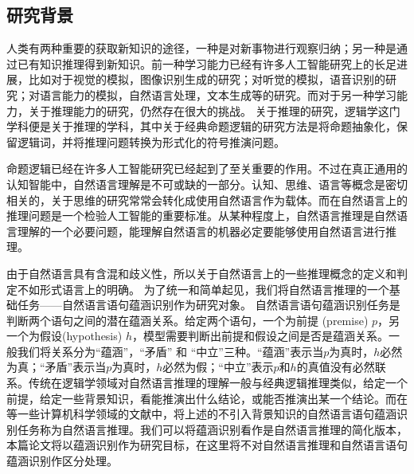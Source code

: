 \documentclass[UTF8,11pt,a4paper,nofonts]{ctexart}
\numberwithin{equation}{section}
\begin{document}
\subsection{研究背景}
\par


人类有两种重要的获取新知识的途径，一种是对新事物进行观察归纳；另一种是通过已有知识推理得到新知识。前一种学习能力已经有许多人工智能研究上的长足进展，比如对于视觉的模拟，图像识别生成的研究\cite{He2016DeepRL}；对听觉的模拟，语音识别的研究\cite{Chan2016ListenAA}；对语言能力的模拟，自然语言处理，文本生成等的研究\cite{Bahdanau2014NeuralMT, Vinyals2015ANC}。而对于另一种学习能力，关于推理能力的研究，仍然存在很大的挑战。
关于推理的研究，逻辑学这门学科便是关于推理的学科，其中关于经典命题逻辑的研究方法是将命题抽象化，保留逻辑词，并将推理问题转换为形式化的符号推演问题。

命题逻辑已经在许多人工智能研究已经起到了至关重要的作用。不过在真正通用的认知智能中，自然语言理解是不可或缺的一部分。认知、思维、语言等概念是密切相关的，关于思维的研究常常会转化成使用自然语言作为载体。而在自然语言上的推理问题是一个检验人工智能的重要标准。从某种程度上，自然语言推理是自然语言理解的一个必要问题，能理解自然语言的机器必定要能够使用自然语言进行推理。

由于自然语言具有含混和歧义性，所以关于自然语言上的一些推理概念的定义和判定不如形式语言上的明确\cite{Marneffe2008FindingCI, Marelli2014ASC}。
为了统一和简单起见，我们将自然语言推理的一个基础任务——自然语言语句蕴涵识别\cite{Nangia2017TheR2, Bowman2015ALA}作为研究对象。
自然语言语句蕴涵识别任务是判断两个语句之间的潜在蕴涵关系。给定两个语句，一个为前提 (premise) $p$，另一个为假设(hypothesis) $h$，模型需要判断出前提和假设之间是否是蕴涵关系。一般我们将关系分为“蕴涵”，“矛盾” 和 “中立”三种。“蕴涵”表示当$p$为真时，$h$必然为真；“矛盾”表示当$p$为真时，$h$必然为假；“中立”表示$p$和$h$的真值没有必然联系。传统在逻辑学领域对自然语言推理的理解一般与经典逻辑推理类似，给定一个前提，给定一些背景知识，看能推演出什么结论，或能否推演出某一个结论。而在\cite{Marneffe2008FindingCI, Marelli2014ASC}等一些计算机科学领域的文献中，将上述的不引入背景知识的自然语言语句蕴涵识别任务称为自然语言推理。我们可以将蕴涵识别看作是自然语言推理的简化版本，本篇论文将以蕴涵识别作为研究目标，在这里将不对自然语言推理和自然语言语句蕴涵识别作区分处理。
\end{document}
